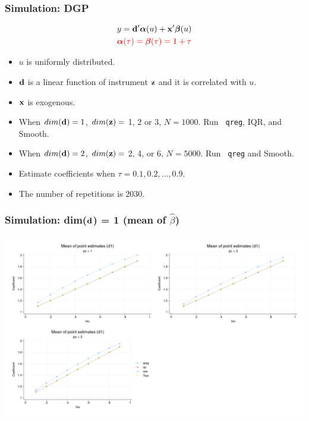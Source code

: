 \documentclass[11pt]{beamer}
\begin{document}
\begin{frame}
  \frametitle{Simulation: DGP}
  \begin{align*}
     y = \mathbf{d}' \boldsymbol{\alpha}(u) + \mathbf{x}' \boldsymbol{\beta}(u) 	\\
     {\color{red}{\boldsymbol{\alpha}(\tau) = \boldsymbol{\beta}(\tau) = 1 + \tau}}
  \end{align*}
  \begin{itemize}
    \item $u$ is uniformly distributed.
    \item $\mathbf{d}$ is a linear function of instrument $\mathbf{z}$ and it is correlated
      with $u$.
    \item $\mathbf{x}$ is exogenous.
    \item When $dim(\mathbf{d}) = 1$, $dim(\mathbf{z}) =$ 1, 2 or 3, $N = 1000$. Run {\tt
      qreg}, IQR, and Smooth.
    \item When $dim(\mathbf{d}) = 2$, $dim(\mathbf{z}) =$ 2, 4, or 6, $N = 5000$. Run {\tt
      qreg} and Smooth.
    \item Estimate coefficients when $\tau = 0.1, 0.2, \ldots, 0.9$.
    \item The number of repetitions is $2030$.
  \end{itemize}
\end{frame}

\begin{frame}
  \frametitle{Simulation: dim($\mathbf{d}$) = 1 (mean of $\hat{\beta}$)}
  \begin{center} 
\includegraphics[scale=0.2]{eps/mbeta_d1}
\end{center}
\end{frame}
\end{document}
